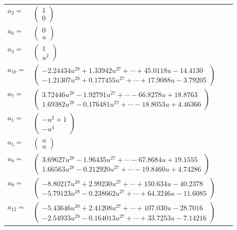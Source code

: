 \documentclass[1p]{elsarticle_modified}
\theoremstyle{definition}
\begin{document}
\begin{tabular}{m{7pt} m{180pt} m{7pt} m{180pt} }
\flushright $a_{2}=$&$\begin{pmatrix}1\\0\end{pmatrix}$ \\
\flushright $a_{6}=$&$\begin{pmatrix}0\\u\end{pmatrix}$ \\
\flushright $a_{3}=$&$\begin{pmatrix}1\\u^2\end{pmatrix}$ \\
\flushright $a_{10}=$&$\begin{pmatrix}-2.24434 u^{28}+1.33942 u^{27}+\cdots+45.0118 u-14.4130\\-1.21307 u^{28}+0.177455 u^{27}+\cdots+17.9088 u-3.79205\end{pmatrix}$ \\
\flushright $a_{7}=$&$\begin{pmatrix}3.72446 u^{28}-1.92791 u^{27}+\cdots-66.8278 u+18.8763\\1.69382 u^{28}-0.176481 u^{27}+\cdots-18.8053 u+4.46366\end{pmatrix}$ \\
\flushright $a_{1}=$&$\begin{pmatrix}- u^2+1\\- u^4\end{pmatrix}$ \\
\flushright $a_{5}=$&$\begin{pmatrix}u\\u\end{pmatrix}$ \\
\flushright $a_{8}=$&$\begin{pmatrix}3.69627 u^{28}-1.96435 u^{27}+\cdots-67.8684 u+19.1555\\1.66563 u^{28}-0.212920 u^{27}+\cdots-19.8460 u+4.74286\end{pmatrix}$ \\
\flushright $a_{9}=$&$\begin{pmatrix}-8.80217 u^{28}+2.99230 u^{27}+\cdots+150.634 u-40.2378\\-5.79123 u^{28}-0.238662 u^{27}+\cdots+64.3246 u-11.6085\end{pmatrix}$ \\
\flushright $a_{12}=$&$\begin{pmatrix}-5.43646 u^{28}+2.41208 u^{27}+\cdots+107.030 u-28.7016\\-2.54933 u^{28}-0.164013 u^{27}+\cdots+33.7253 u-7.14216\end{pmatrix}$ \\

\end{tabular}
\end{document}
